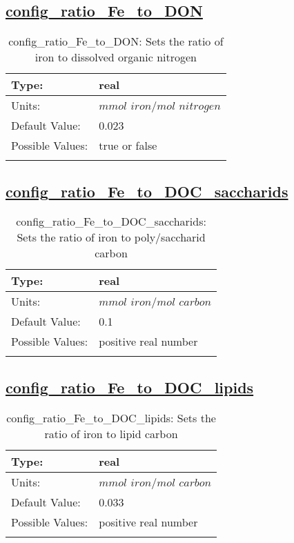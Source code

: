 \subsection[config\_ratio\_Fe\_to\_DON]{\hyperref[sec:nm_tab_biogeochemistry]{config\_ratio\_Fe\_to\_DON}}
\label{subsec:nm_sec_config_ratio_Fe_to_DON}
\begin{center}
\begin{longtable}{| p{2.0in} || p{4.0in} |}
    \hline
    Type: & real \\
    \hline
    Units: & $mmol$ $iron/mol$ $nitrogen$ \\
    \hline
    Default Value: & 0.023 \\
    \hline
    Possible Values: & true or false \\
    \hline
    \caption{config\_ratio\_Fe\_to\_DON: Sets the ratio of iron to dissolved organic nitrogen}
\end{longtable}
\end{center}
\subsection[config\_ratio\_Fe\_to\_DOC\_saccharids]{\hyperref[sec:nm_tab_biogeochemistry]{config\_ratio\_Fe\_to\_DOC\_saccharids}}
\label{subsec:nm_sec_config_ratio_Fe_to_DOC_saccharids}
\begin{center}
\begin{longtable}{| p{2.0in} || p{4.0in} |}
    \hline
    Type: & real \\
    \hline
    Units: & $mmol$ $iron/mol$ $carbon$ \\
    \hline
    Default Value: & 0.1 \\
    \hline
    Possible Values: & positive real number \\
    \hline
    \caption{config\_ratio\_Fe\_to\_DOC\_saccharids: Sets the ratio of iron to poly/saccharid carbon}
\end{longtable}
\end{center}
\subsection[config\_ratio\_Fe\_to\_DOC\_lipids]{\hyperref[sec:nm_tab_biogeochemistry]{config\_ratio\_Fe\_to\_DOC\_lipids}}
\label{subsec:nm_sec_config_ratio_Fe_to_DOC_lipids}
\begin{center}
\begin{longtable}{| p{2.0in} || p{4.0in} |}
    \hline
    Type: & real \\
    \hline
    Units: & $mmol$ $iron/mol$ $carbon$ \\
    \hline
    Default Value: & 0.033 \\
    \hline
    Possible Values: & positive real number \\
    \hline
    \caption{config\_ratio\_Fe\_to\_DOC\_lipids: Sets the ratio of iron to lipid carbon}
\end{longtable}
\end{center}
